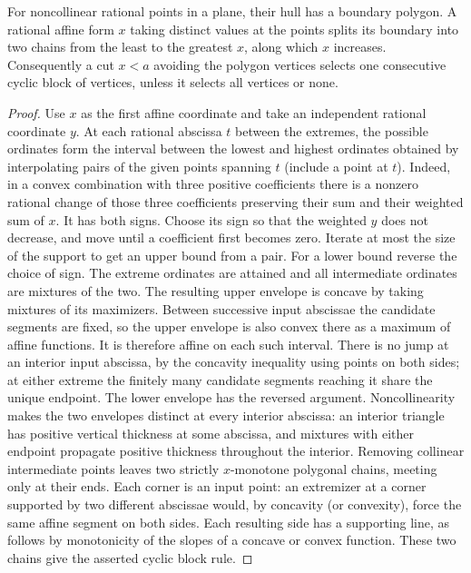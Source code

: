 \begin{lemma}\label{idx-algebraic302}
For noncollinear rational points in a plane, their hull has a boundary
polygon. A rational affine form $x$ taking distinct values at the points
splits its boundary into two chains from the least to the greatest
$x$, along which $x$ increases. Consequently a cut $x<a$ avoiding the
polygon vertices selects one consecutive cyclic block of vertices, unless
it selects all vertices or none.
\end{lemma}
\begin{proof}
Use $x$ as the first affine coordinate and take an independent rational
coordinate $y$. At each rational abscissa $t$ between the extremes, the
possible ordinates form the interval between the lowest and highest
ordinates obtained by interpolating pairs of the given points spanning
$t$ (include a point at $t$). Indeed, in a convex combination with
three positive coefficients there is a nonzero rational change of those
three coefficients preserving their sum and their weighted sum of $x$.
It has both signs. Choose its sign so that the weighted $y$ does not
decrease, and move until a coefficient first becomes zero. Iterate at
most the size of the support to get an upper bound from a pair. For a
lower bound reverse the choice of sign. The extreme ordinates are
attained and all intermediate ordinates are mixtures of the two.
The resulting upper envelope is concave by taking mixtures of its
maximizers. Between successive input abscissae the candidate segments
are fixed, so the upper envelope is also convex there as a maximum of
affine functions. It is therefore affine on each such interval.
There is no jump at an interior input abscissa, by the concavity
inequality using points on both sides; at either extreme the finitely
many candidate segments reaching it share the unique endpoint.
The lower envelope has the reversed argument. Noncollinearity makes
the two envelopes distinct at every interior abscissa: an interior
triangle has positive vertical thickness at some abscissa, and mixtures
with either endpoint propagate positive thickness throughout the
interior. Removing collinear intermediate points leaves two strictly
$x$-monotone polygonal chains, meeting only at their ends. Each corner
is an input point: an extremizer at a corner supported by two different
abscissae would, by concavity (or convexity), force the same affine
segment on both sides. Each resulting side has a supporting line, as
follows by monotonicity of the slopes of a concave or convex function.
These two chains give the asserted cyclic block rule.
\end{proof}

